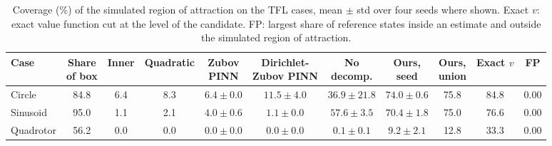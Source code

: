 \begin{table}[t]
\centering\footnotesize\setlength{\tabcolsep}{4pt}
\caption{Coverage (\%) of the simulated region of attraction on the TFL cases, mean $\pm$ std over four seeds where shown. Exact $v$: exact value function cut at the level of the candidate. FP: largest share of reference states inside an estimate and outside the simulated region of attraction.}
\label{tab:main}
\begin{tabular}{@{}lcccccccccc@{}}
\toprule
Case & \shortstack{Share\\of box} & Inner & Quadratic & \shortstack{Zubov\\PINN} & \shortstack{Dirichlet-\\Zubov PINN} & \shortstack{No\\decomp.} & \shortstack{Ours,\\seed} & \shortstack{Ours,\\union} & Exact $v$ & FP\\
\midrule
Circle & 84.8 & 6.4 & 8.3 & $6.4\pm0.0$ & $11.5\pm4.0$ & $36.9\pm21.8$ & $74.0\pm0.6$ & 75.8 & 84.8 & 0.00\\
Sinusoid & 95.0 & 1.1 & 2.1 & $4.0\pm0.6$ & $1.1\pm0.0$ & $57.6\pm3.5$ & $70.4\pm1.8$ & 75.0 & 76.6 & 0.00\\
Quadrotor & 56.2 & 0.0 & 0.0 & $0.0\pm0.0$ & $0.0\pm0.0$ & $0.1\pm0.1$ & $9.2\pm2.1$ & 12.8 & 33.3 & 0.00\\
\bottomrule
\end{tabular}
\end{table}
